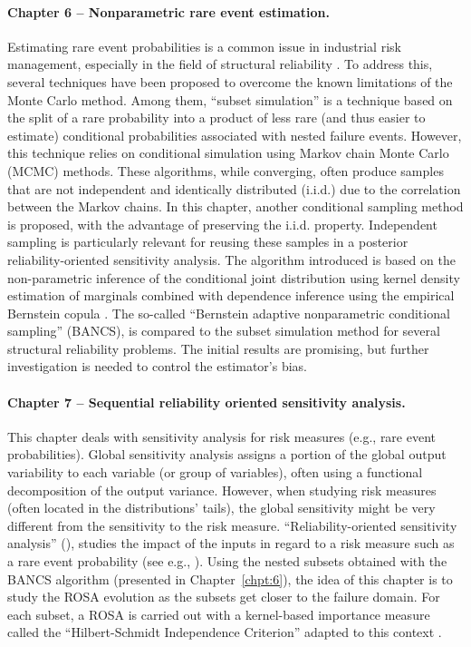 \paragraph{Chapter 6 -- Nonparametric rare event estimation.} 
Estimating rare event probabilities is a common issue in industrial risk management, especially in the field of structural reliability \citep{chabridon_2018_thesis}. 
To address this, several techniques have been proposed to overcome the known limitations of the Monte Carlo method. 
Among them, ``subset simulation'' \citep{AuBeck2001} is a technique based on the split of a rare probability into a product of less rare (and thus easier to estimate) conditional probabilities associated with nested failure events. 
However, this technique relies on conditional simulation using Markov chain Monte Carlo (MCMC) methods. 
These algorithms, while converging, often produce samples that are not independent and identically distributed (i.i.d.) due to the correlation between the Markov chains.
In this chapter, another conditional sampling method is proposed, with the advantage of preserving the i.i.d. property. 
Independent sampling is particularly relevant for reusing these samples in a posterior reliability-oriented sensitivity analysis. 
The algorithm introduced is based on the non-parametric inference of the conditional joint distribution using kernel density estimation of marginals combined with dependence inference using the empirical Bernstein copula \citep{sancetta_satchell_2004}. 
The so-called ``Bernstein adaptive nonparametric conditional sampling'' (BANCS), is compared to the subset simulation method for several structural reliability problems. 
The initial results are promising, but further investigation is needed to control the estimator's bias.


\paragraph{Chapter 7 -- Sequential reliability oriented sensitivity analysis.} 
This chapter deals with sensitivity analysis for risk measures (e.g., rare event probabilities). 
Global sensitivity analysis \citep{daveiga_iooss_2021} assigns a portion of the global output variability to each variable (or group of variables), often using a functional decomposition of the output variance. 
However, when studying risk measures (often located in the distributions' tails), the global sensitivity might be very different from the sensitivity to the risk measure. 
``Reliability-oriented sensitivity analysis'' (), studies the impact of the inputs in regard to a risk measure such as a rare event probability (see e.g., \citealp{chabridon_2018_thesis}). 
Using the nested subsets obtained with the BANCS algorithm (presented in Chapter~\ref{chpt:6}), the idea of this chapter is to study the ROSA evolution as the subsets get closer to the failure domain. 
For each subset, a ROSA is carried out with a kernel-based importance measure called the ``Hilbert-Schmidt Independence Criterion'' adapted to this context \citep{marrel_chabridon_2021}. 

